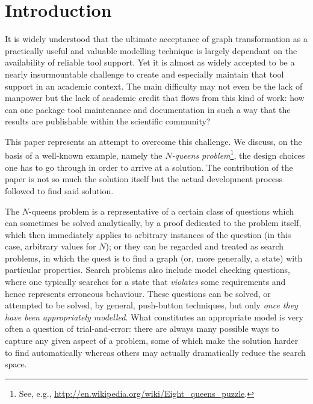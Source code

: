 
\section{Introduction}

It is widely understood that the ultimate acceptance of graph transformation as
a practically useful and valuable modelling technique is largely dependant on
the availability of reliable tool support. Yet it is almost as widely accepted
to be a nearly insurmountable challenge to create and especially maintain that
tool support in an academic context. The main difficulty may not even be the
lack of manpower but the lack of academic credit that flows from this kind of
work: how can one package tool maintenance and documentation in such a way that
the results are publishable within the scientific community?

This paper represents an attempt to overcome this challenge. We discuss, on the
basis of a well-known example, namely the
\emph{$N$-queens problem}\footnote{See, e.g.,
\url{http://en.wikipedia.org/wiki/Eight_queens_puzzle}.}, the design choices
one has to go through in order to arrive at a solution. The contribution of the
paper is not so much the solution itself but the actual development process
followed to find said solution.

The $N$-queens problem is a representative of a certain class of questions
which can sometimes be solved analytically, by a proof dedicated to the problem
itself, which then immediately applies to arbitrary instances of the question
(in this case, arbitrary values for $N$); or they can be regarded and treated as
search problems, in which the quest is to find a graph (or, more generally, a
state) with particular properties. Search problems also include model checking
questions, where one typically searches for a state that \emph{violates} some
requirements and hence represents erroneous behaviour. These questions can
be solved, or attempted to be solved, by general, push-button techniques, but
only \emph{once they have been appropriately modelled}. What constitutes an
appropriate model is very often a question of trial-and-error: there are always
many possible ways to capture any given aspect of a problem, some of which make
the solution harder to find automatically whereas others may actually
dramatically reduce the search space.

